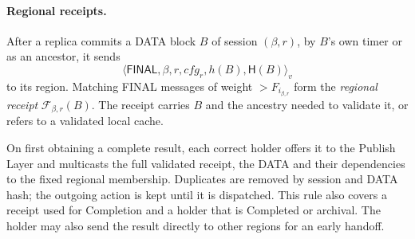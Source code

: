 \documentclass[11pt,a4paper]{article}
\newcommand{\FC}{\mathcal F}
\newcommand{\Hash}{\mathsf H}
\newcommand{\tagg}[1]{\ensuremath{\mathsf{#1}}}
\newcommand{\defterm}[1]{\textcolor{rrBlue}{\textit{#1}}}
\begin{document}
\paragraph{Regional receipts.}
After a replica commits a DATA block $B$ of session $(\beta,r)$, by $B$'s
own timer or as an ancestor, it sends
\[
 \langle\tagg{FINAL},\beta,r,\mathit{cfg}_r,h(B),\Hash(B)\rangle_v
\]
to its region. Matching FINAL messages of weight $>F_{i_{\beta,r}}$ form
the \defterm{regional receipt} $\FC_{\beta,r}(B)$. The receipt carries
$B$ and the ancestry needed to validate it, or refers to a validated
local cache.

On first obtaining a complete result, each correct holder offers it to
the Publish Layer and multicasts the full validated receipt, the DATA
and their dependencies to the fixed regional membership. Duplicates are
removed by session and DATA hash; the outgoing action is kept until it
is dispatched. This rule also covers a receipt used for Completion and
a holder that is Completed or archival. The holder may also send the
result directly to other regions for an early handoff.
\end{document}
